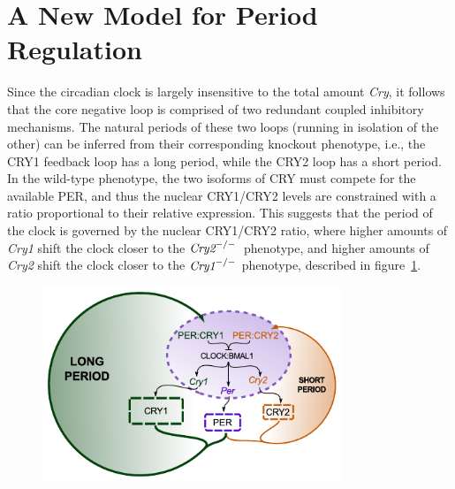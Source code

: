 \section{A New Model for Period Regulation}
Since the circadian clock is largely insensitive to the total amount {\it Cry}, it follows that the core negative loop is comprised of two redundant coupled inhibitory mechanisms. The natural periods of these two loops (running in isolation of the other) can be inferred from their corresponding knockout phenotype, i.e., the CRY1 feedback loop has a long period, while the CRY2 loop has a short period. In the wild-type phenotype, the two isoforms of CRY must compete for the available PER, and thus the nuclear CRY1/CRY2 levels are constrained with a ratio proportional to their relative expression. This suggests that the period of the clock is governed by the nuclear CRY1/CRY2 ratio, where higher amounts of {\it Cry1} shift the clock closer to the $\text{\it Cry2}^{-/-}$ phenotype, and higher amounts of {\it Cry2} shift the clock closer to the $\text{\it Cry1}^{-/-}$ phenotype, described in figure~\ref{fig:twoloops}.

\begin{figure}[bt]
  \centering
  \begin{minipage}{0.8\textwidth}
    \centering
    \includegraphics[width=0.8\textwidth]{chap2/figures/twoloops_noopacity.pdf}
     \label{fig:twoloops}
  \end{minipage}
\end{figure}

